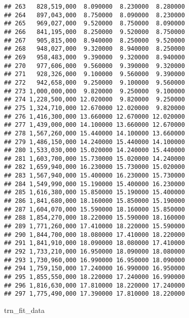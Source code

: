 \documentclass[]{article}
\newenvironment{Shaded}{\begin{snugshade}}{\end{snugshade}}
\newcommand{\NormalTok}[1]{#1}
\begin{document}
\begin{verbatim}
## 263   828,519,000  8.090000  8.230000  8.280000
## 264   897,043,000  8.750000  8.090000  8.230000
## 265   969,027,000  9.520000  8.750000  8.090000
## 266   841,195,000  8.250000  9.520000  8.750000
## 267   905,815,000  8.940000  8.250000  9.520000
## 268   948,027,000  9.320000  8.940000  8.250000
## 269   958,483,000  9.390000  9.320000  8.940000
## 270   977,606,000  9.560000  9.390000  9.320000
## 271   928,326,000  9.100000  9.560000  9.390000
## 272   942,658,000  9.250000  9.100000  9.560000
## 273 1,000,000,000  9.820000  9.250000  9.100000
## 274 1,228,500,000 12.020000  9.820000  9.250000
## 275 1,324,710,000 12.670000 12.020000  9.820000
## 276 1,416,300,000 13.660000 12.670000 12.020000
## 277 1,439,000,000 14.100000 13.660000 12.670000
## 278 1,567,260,000 15.440000 14.100000 13.660000
## 279 1,486,150,000 14.240000 15.440000 14.100000
## 280 1,533,030,000 15.020000 14.240000 15.440000
## 281 1,603,700,000 15.730000 15.020000 14.240000
## 282 1,659,940,000 16.230000 15.730000 15.020000
## 283 1,567,940,000 15.400000 16.230000 15.730000
## 284 1,549,990,000 15.190000 15.400000 16.230000
## 285 1,616,380,000 15.850000 15.190000 15.400000
## 286 1,841,680,000 18.160000 15.850000 15.190000
## 287 1,604,070,000 15.590000 18.160000 15.850000
## 288 1,854,270,000 18.220000 15.590000 18.160000
## 289 1,771,260,000 17.410000 18.220000 15.590000
## 290 1,844,700,000 18.080000 17.410000 18.220000
## 291 1,841,910,000 18.090000 18.080000 17.410000
## 292 1,733,210,000 16.950000 18.090000 18.080000
## 293 1,730,960,000 16.990000 16.950000 18.090000
## 294 1,759,150,000 17.240000 16.990000 16.950000
## 295 1,855,550,000 18.220000 17.240000 16.990000
## 296 1,816,630,000 17.810000 18.220000 17.240000
## 297 1,775,490,000 17.390000 17.810000 18.220000
\end{verbatim}

\begin{Shaded}
\begin{Highlighting}[]
\NormalTok{trn_fit_data}
\end{Highlighting}
\end{Shaded}
\end{document}
